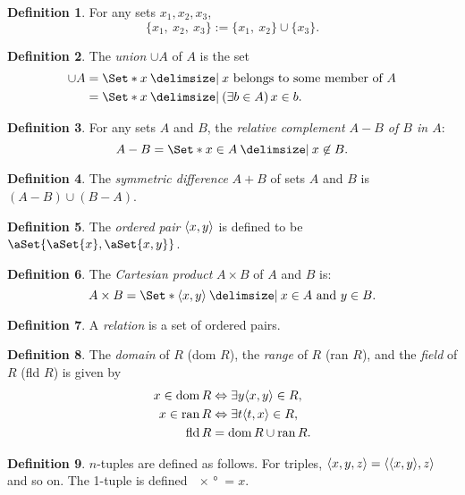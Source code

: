 \documentclass[12pt]{article}
\theoremstyle{plain}
\theoremstyle{remark}
\theoremstyle{definition}
\newtheorem{defn}{Definition}[section]
\theoremstyle{remark}
\providecommand\st{}
\newcommand\SetSymbol[1][]{%
\nonscript\:#1\vert%
\allowbreak%
\nonscript\:
\mathopen{}}
\DeclarePairedDelimiter{\ang}{\langle}{\rangle}
\renewcommand\st{\SetSymbol[\delimsize]}
\DeclarePairedDelimiter\aSet\{\}
\renewcommand{\iff}{\Leftrightarrow}
\DeclareMathOperator{\dom}{dom}
\DeclareMathOperator{\ran}{ran}
\DeclareMathOperator{\fld}{fld}
\begin{document}
\begin{defn}
For any sets $x_1, x_2, x_3$,
\[
\{x_1,\ x_2,\ x_3\} := \{x_1,\ x_2\} \cup \{x_3\}.
\]
\end{defn}

\begin{defn}
The \textit{union} $\cup A$ of $A$ is the set
\begin{align*}
\cup A &= \Set*{x \st \text{$x$ belongs to some member of $A$}}\\
&= \Set*{x \st (\exists b \in A)\, x \in b}.
\end{align*}
\end{defn}

\begin{defn}
For any sets $A$ and $B$, the \textit{relative complement $A-B$ of $B$ in $A$}:
\[
A - B = \Set*{x \in A \st x \not\in B}.
\]
\end{defn}

\begin{defn}
The \textit{symmetric difference} $A+B$ of sets $A$ and $B$ is $(A - B) \cup (B - A)$.
\end{defn}

\begin{defn}
The \textit{ordered pair} $\ang{x, y}$ is defined to be $\aSet{\aSet{x}, \aSet{x, y}}$.
\end{defn}

\begin{defn}
The \textit{Cartesian product} $A \times B$ of $A$ and $B$ is:
\[
A \times B = \Set*{\ang{x,y} \st x \in A\ \text{and}\ y \in B}.
\]
\end{defn}

\begin{defn}
A \textit{relation} is a set of ordered pairs.
\end{defn}

\begin{defn}
The \textit{domain} of $R$ (dom $R$), the \textit{range} of $R$ (ran $R$), and the \textit{field} of $R$ (fld $R$) is given by
\begin{align*}
x \in \dom{R} &\iff \exists y \ang{x, y} \in R,\\
x \in \ran{R} &\iff \exists t \ang{t, x} \in R,\\
\fld{R} &= \dom{R} \cup \ran{R}.
\end{align*}
\end{defn}

\begin{defn}
$n$-tuples are defined as follows. For triples, $\ang{x,y,z} = \ang{\ang{x,y},z }$ and so on. The 1-tuple is defined $\ang{x} = x$.
\end{defn}
\end{document}
